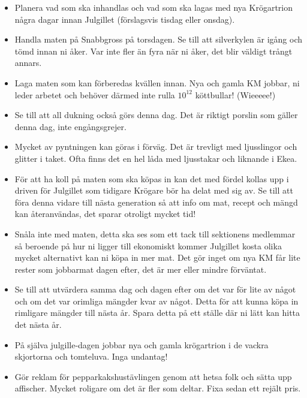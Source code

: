 \documentclass[10pt]{article}
\begin{document}
\begin{itemize}
    \item Planera vad som ska inhandlas och vad som ska lagas med nya Krögartrion några
dagar innan Julgillet (förslagsvis tisdag eller onsdag).
	\item Handla maten på Snabbgross på torsdagen. Se till att silverkylen är igång och
tömd innan ni åker. Var inte fler än fyra när ni åker, det blir väldigt trångt annars.
	\item Laga maten som kan förberedas kvällen innan. Nya och gamla KM jobbar, ni
leder arbetet och behöver därmed inte rulla $10^{12}$ köttbullar! (Wieeeee!)
	\item Se till att all dukning också görs denna dag. Det är riktigt porslin
som gäller denna dag, inte engångsgrejer.
    \item Mycket av pyntningen kan göras i förväg. Det är trevligt med ljusslingor och
glitter i taket. Ofta finns det en hel låda med ljusstakar och liknande i Ekea.
	\item För att ha koll på maten som ska köpas in kan det med fördel kollas upp i driven
för Julgillet som tidigare Krögare bör ha delat med sig av. Se till att föra denna vidare till nästa generation så att info om mat, recept och mängd kan återanvändas, det sparar
otroligt mycket tid!
	\item Snåla inte med maten, detta ska ses som ett tack till sektionens medlemmar så
beroende på hur ni ligger till ekonomiskt kommer Julgillet kosta olika mycket
alternativt kan ni köpa in mer mat. Det gör inget om nya KM får lite rester som
jobbarmat dagen efter, det är mer eller mindre förväntat.
	\item Se till att utvärdera samma dag och dagen efter om det var för lite av något och
om det var orimliga mängder kvar av något. Detta för att kunna köpa in rimligare
mängder till nästa år. Spara detta på ett ställe där ni lätt kan hitta det nästa år.
	\item På själva julgille-dagen jobbar nya och gamla krögartrion i de vackra skjortorna
och tomteluva. Inga undantag!
	\item Gör reklam för pepparkakshustävlingen genom att hetsa folk och sätta upp affischer. Mycket roligare om det är fler som deltar. Fixa sedan ett rejält pris.

\end{itemize}
\end{document}
